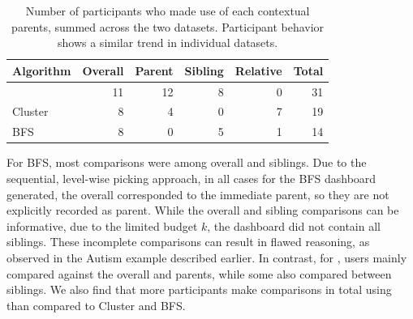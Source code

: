 \begin{table}[h!]
\centering
	\begin{tabular}{l|rrrr|r}
	\hline
	 Algorithm   &   Overall &   Parent &   Sibling &   Relative &   Total \\
	\hline
	 \system     &        11 &       12 &         8 &          0 &      31 \\
	 Cluster     &         8 &        4 &         0 &          7 &      19 \\
	 BFS         &         8 &        0 &         5 &          1 &      14 \\
	\hline
	\end{tabular}
\label{table:contextual_reference_count}
\caption{Number of participants who made use of each contextual parents, summed across the two datasets. Participant behavior shows a similar trend in individual datasets.}
\end{table}
\par For BFS, most comparisons were among overall and siblings. Due to the sequential, level-wise picking approach, in all cases for the BFS dashboard generated, the overall corresponded to the immediate parent, so they are not explicitly recorded as parent. While the overall and sibling comparisons can be informative, due to the limited budget $k$, the dashboard did not contain all siblings. These incomplete comparisons can result in flawed reasoning, as observed in the Autism example described earlier. In contrast, for \system, users mainly compared against the overall and parents, while some also compared between siblings. We also find that more participants make comparisons in total using \system than compared to Cluster and BFS.

